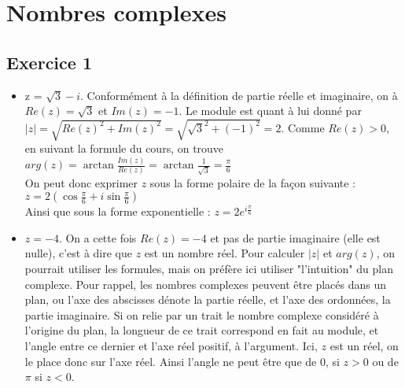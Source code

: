 \documentclass{article}
\begin{document}
\section{Nombres complexes}

\subsection{Exercice 1}
\begin{itemize}
    \item z = $\sqrt{3}-i$. Conformément à la définition de partie réelle et imaginaire, on à $Re(z) = \sqrt{3}$ et $Im(z) = -1$. Le module est quant à lui donné par $|z| = \sqrt{{Re(z)}^2+{Im(z)}^2} = \sqrt{\sqrt{3}^2+(-1)^2}= 2$. Comme $Re(z)>0$, en suivant la formule du cours, on trouve $arg(z) =\arctan{ \frac{Im(z)}{Re(z)}} = \arctan{\frac{1}{\sqrt{3}}} = \frac{\pi}{6} $  \\
    On peut donc exprimer $z$ sous la forme polaire de la façon suivante : $z = 2(\cos{\frac{\pi}{6}}+i\sin{\frac{\pi}{6}})$ \\
    Ainsi que sous la forme exponentielle : $z = 2e^{i\frac{\pi}{6} }$
    \item $z = -4$. On a cette fois $Re(z)=-4$ et pas de partie imaginaire (elle est nulle), c'est à dire que $z$ est un nombre réel. Pour calculer $|z|$ et $arg(z)$, on pourrait utiliser les formules, mais on préfère ici utiliser "l'intuition" du plan complexe. Pour rappel, les nombres complexes peuvent être placés dans un plan, ou l'axe des abscisses dénote la partie réelle, et l'axe des ordonnées, la partie imaginaire. Si on relie par un trait le nombre complexe considéré à l'origine du plan, la longueur de ce trait correspond en fait au module, et l'angle entre ce dernier et l'axe réel positif, à l'argument. Ici, $z$ est un réel, on le place donc sur l'axe réel. Ainsi l'angle ne peut être que de 0, si $z > 0$ ou de $\pi$ si $z < 0$.
\begin{center}
\end{center}
\end{itemize}
\end{document}
